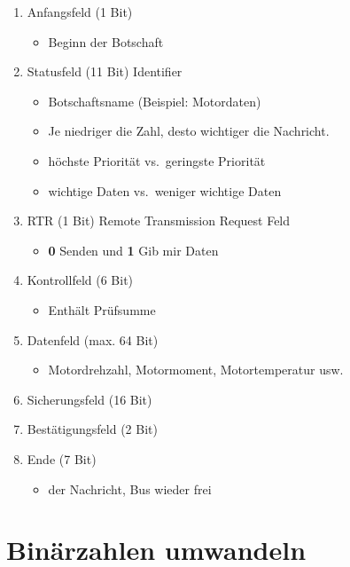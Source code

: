 \begin{enumerate}
\item
  Anfangsfeld (1 Bit)

  \begin{itemize}
  \item
    Beginn der Botschaft
  \end{itemize}
\item
  Statusfeld (11 Bit) Identifier

  \begin{itemize}
  \item
    Botschaftsname (Beispiel: Motordaten)
  \item
    Je niedriger die Zahl, desto wichtiger die Nachricht.
  \item
    höchste Priorität vs.~geringste Priorität
  \item
    wichtige Daten vs.~weniger wichtige Daten
  \end{itemize}
\item
  RTR (1 Bit) Remote Transmission Request Feld

  \begin{itemize}
  \item
    \textbf{0} Senden und \textbf{1} Gib mir Daten
  \end{itemize}
\item
  Kontrollfeld (6 Bit)

  \begin{itemize}
  \item
    Enthält Prüfsumme
  \end{itemize}
\item
  Datenfeld (max. 64 Bit)

  \begin{itemize}
  \item
    Motordrehzahl, Motormoment, Motortemperatur usw.
  \end{itemize}
\item
  Sicherungsfeld (16 Bit)
\item
  Bestätigungsfeld (2 Bit)
\item
  Ende (7 Bit)

  \begin{itemize}
  \item
    der Nachricht, Bus wieder frei
  \end{itemize}
\end{enumerate}

\newpage

\section{Binärzahlen umwandeln}\label{binaerzahlen-umwandeln}


